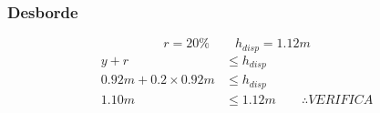 \documentclass[10.5pt]{article}
\begin{document}
\subsubsection*{Desborde}

\begin{equation*}
 r = 20\%
 \qquad
 h_{disp} = 1.12 m
\end{equation*}
\begin{align*}
 y + r &\leq h_{disp} \\
 0.92 m + 0.2 \times 0.92 m &\leq h_{disp} \\
 1.10 m &\leq 1.12 m
 \qquad
 \therefore VERIFICA
\end{align*}
\end{document}
